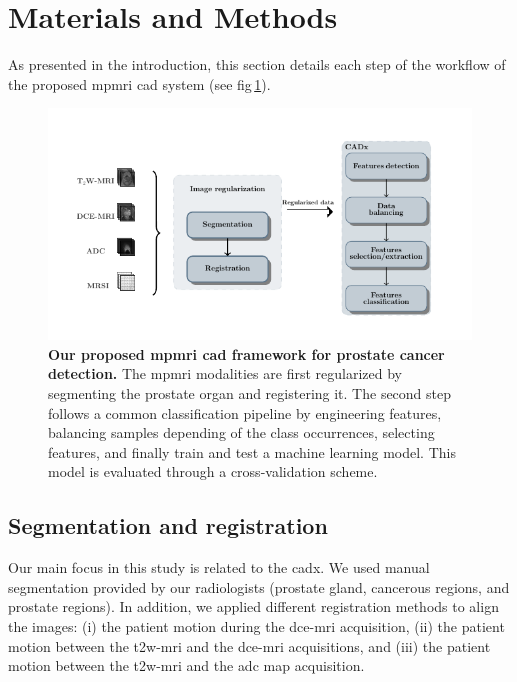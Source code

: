 \documentclass[final,3p,times,twocolumn]{elsarticle}
\begin{document}
\section{Materials and Methods} \label{sec:materials_and_methods}

As presented in the introduction, this section details each step of the
workflow of the proposed \ac{mpmri} \ac{cad} system (see
\acs{fig}\,\ref{fig:wkfcad}).

\begin{figure}
  \centering
  \includegraphics[width=1.0\linewidth]{./images/cad/wkfcad.pdf}
  \caption{\textbf{Our proposed \ac{mpmri} \ac{cad} framework for prostate cancer
    detection.} The \ac{mpmri} modalities are first regularized by segmenting
  the prostate organ and registering it. The second step follows a common
  classification pipeline by engineering features, balancing samples depending of
  the class occurrences, selecting features, and finally train and test a machine
  learning model. This model is evaluated through a cross-validation scheme.}
  \label{fig:wkfcad}
\end{figure}

\subsection{Segmentation and registration}

Our main focus in this study is related to the \ac{cadx}. We used manual
segmentation provided by our radiologists (prostate gland, cancerous regions,
and prostate regions). In addition, we applied different registration methods
to align the images: (i) the patient motion during the \ac{dce}-\ac{mri}
acquisition, (ii) the patient motion between the \ac{t2w}-\ac{mri} and the
\ac{dce}-\ac{mri} acquisitions, and (iii) the patient motion between the
\ac{t2w}-\ac{mri} and the \ac{adc} map acquisition.
\end{document}
